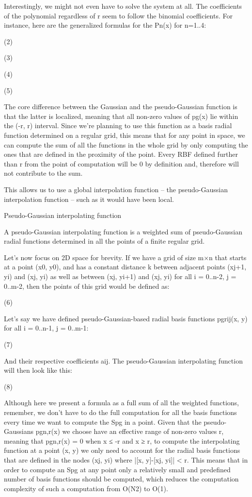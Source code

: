 \documentclass[12pt,a4paper]{article}
\begin{document}
\par
Interestingly, we might not even have to solve the system at all. The coefficients of the polynomial regardless of r seem to follow the binomial coefficients. For instance, here are the generalized formulas for the Pn(x) for n=1..4:
\par
(2)
\par
(3)
\par
(4)
\par
(5)
\par
The core difference between the Gaussian and the pseudo-Gaussian function is that the latter is localized, meaning that all non-zero values of pg(x) lie within the (-r, r) interval. Since we’re planning to use this function as a basis radial function determined on a regular grid, this means that for any point in space, we can compute the sum of all the functions in the whole grid by only computing the ones that are defined in the proximity of the point. Every RBF defined further than r from the point of computation will be 0 by definition and, therefore will not contribute to the sum.
\par
This allows us to use a global interpolation function – the pseudo-Gaussian interpolation function – such as it would have been local.
\par
Pseudo-Gaussian interpolating function
\par
A pseudo-Gaussian interpolating function is a weighted sum of pseudo-Gaussian radial functions determined in all the points of a finite regular grid.
\par
Let’s now focus on 2D space for brevity. If we have a grid of size m×n that starts at a point (x0, y0), and has a constant distance k between adjacent points (xj+1, yi) and (xj, yi) as well as between (xj, yi+1) and (xj, yi) for all i = 0..n-2, j = 0..m-2, then the points of this grid would be defined as:
\par
(6)
\par
Let’s say we have defined pseudo-Gaussian-based radial basis functions pgrij(x, y) for all i = 0..n-1, j = 0..m-1:
\par
(7)
\par
And their respective coefficients aij. The pseudo-Gaussian interpolating function will then look like this:
\par
(8)
\par
Although here we present a formula as a full sum of all the weighted functions, remember, we don’t have to do the full computation for all the basis functions every time we want to compute the Spg in a point. Given that the pseudo-Gaussians pgn,r(x) we choose have an effective range of non-zero values r, meaning that pgn,r(x) = 0 when x ≤ -r and x ≥ r, to compute the interpolating function at a point (x, y) we only need to account for the radial basis functions that are defined in the nodes (xj, yi) where |[x, y]-[xj, yi]| < r. This means that in order to compute an Spg at any point only a relatively small and predefined number of basis functions should be computed, which reduces the computation complexity of such a computation from O(N2) to O(1).
\end{document}
